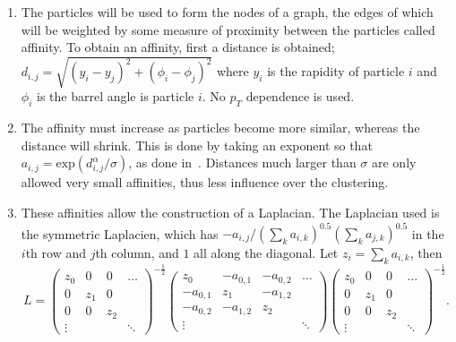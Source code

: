     \begin{enumerate}
        \item \label{step:start} The particles will be used to form the nodes of a graph,
        the edges of which will be weighted by some measure of proximity between the particles called affinity.
        To obtain an affinity, first a distance is obtained; \(d_{i,j} = \sqrt{(y_i - y_j)^2 + (\phi_i - \phi_j)^2}\)
        where \(y_i\) is the rapidity of particle \(i\) and \(\phi_i\) is the barrel angle is particle \(i\).
        No \(p_T\) dependence is used.

    \item \label{step:affinity} The affinity must increase as particles become more similar, whereas the distance will shrink.
            This is done by taking an exponent so that \(a_{i,j} = \text{exp}(d_{i,j}^\alpha/\sigma)\), as done in~\cite{hadjighasem2016votex}. %
            Distances much larger than \(\sigma\) are only allowed very small affinities,
            thus less influence over the clustering.

        \item These affinities allow the construction of a Laplacian.
            The Laplacian used is the symmetric Laplacien, which has \(-a_{i,j}/(\sum_k a_{i,k})^{0.5}(\sum_k a_{j,k})^{0.5}\)
            in the \(i\)th row and \(j\)th column, and \(1\) all along the diagonal.
            Let \(z_i = \sum_k a_{i,k}\), then
    \begin{equation}\label{eqn:laplacian}
        L = 
        \begin{pmatrix}
            z_0      & 0   & 0  & \hdots \\
               0     & z_1 &    0     & \\
               0     &    0     & z_2 & \\
            \vdots   &          &     & \ddots 
        \end{pmatrix}^{-\frac{1}{2}}
        \begin{pmatrix}
            z_0 & -a_{0,1} & -a_{0,2} & \hdots \\
            -a_{0,1} & z_1 & -a_{1,2} & \\
            -a_{0,2} & -a_{1,2} & z_2 & \\
            \vdots   &          &     & \ddots 
        \end{pmatrix}
        \begin{pmatrix}
            z_0 &    0     &    0     & \hdots \\
               0     & z_1 &    0     & \\
               0     &    0     & z_2 & \\
            \vdots   &          &     & \ddots 
        \end{pmatrix}^{-\frac{1}{2}}.
    \end{equation}


\end{enumerate}
